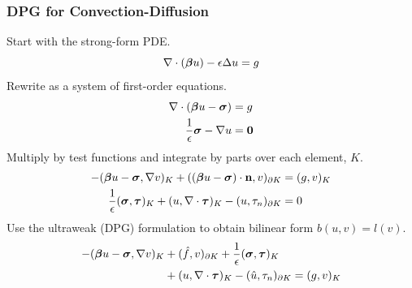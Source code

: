 \documentclass{beamer}
\begin{document}
\begin{frame}
\frametitle{DPG for Convection-Diffusion}
Start with the strong-form PDE.
\[
\nabla\cdot(\boldsymbol\beta u)-\epsilon\Delta u = g
\]
Rewrite as a system of first-order equations.
\begin{align*}
\nabla\cdot(\boldsymbol\beta u-\boldsymbol\sigma)&=g\\
\frac{1}{\epsilon}\boldsymbol\sigma-\nabla u&=\boldsymbol0
\end{align*}
Multiply by test functions and integrate by parts over each element, $K$.
\begin{align*}
-(\boldsymbol\beta u-\boldsymbol\sigma,\nabla v)_K+((\boldsymbol\beta
u-\boldsymbol\sigma)\cdot\mathbf{n},v)_{\partial K}&=(g,v)_K\\
\frac{1}{\epsilon}(\boldsymbol\sigma,\boldsymbol\tau)_K+(u,\nabla\cdot\boldsymbol\tau)_K
-(u,\tau_n)_{\partial K}&=0
\end{align*}
Use the ultraweak (DPG) formulation to obtain bilinear form $b(u,v)=l(v)$.
\begin{align*}
-(\boldsymbol\beta u-\boldsymbol\sigma,\nabla v)_K&+(\hat f,v)_{\partial K}
+ \frac{1}{\epsilon}(\boldsymbol\sigma,\boldsymbol\tau)_K\\
&+(u,\nabla\cdot\boldsymbol\tau)_K
-(\hat u,\tau_n)_{\partial K}=(g,v)_K
\end{align*}
\end{frame}

\end{document}
